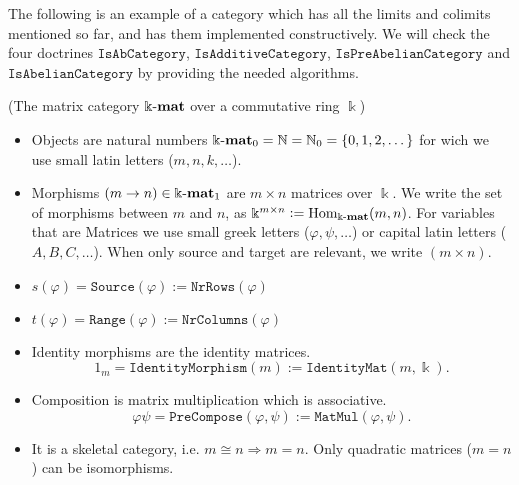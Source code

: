 The following is an example of a category which has all the limits and colimits mentioned so far, and has them implemented constructively.
We will check the four doctrines $\mathtt{IsAbCategory}$, $\mathtt{IsAdditiveCategory}$, $\mathtt{IsPreAbelianCategory}$ and
$\mathtt{IsAbelianCategory}$ by providing the needed algorithms.

\begin{example}{(The matrix category $\Bbbk\textnormal{-}\mathbf{mat}$ over a commutative ring $\Bbbk$)}\label{ex:kmat_skeletal}
\begin{itemize}
\item Objects are natural numbers $\Bbbk\textnormal{-}\mathbf{mat}_{0} = \mathbb{N} = \mathbb{N}_{0} = \{0,1,2,\dots\}$ for wich we use small latin letters
($m, n, k,\dots$).
\item Morphisms $(m \rightarrow n) \in \Bbbk\textnormal{-}\mathbf{mat}_{1}$ are $m \times n$ matrices over $\Bbbk$.
We write the set of morphisms between $m$ and $n$, as $\Bbbk^{m\times n} := \textup{Hom}_{\Bbbk\textnormal{-}\mathbf{mat}}(m,n)$. 
For variables that are Matrices we use small greek letters ($\varphi, \psi,\dots$) or capital latin letters ($A, B, C,\dots$). When only source and target are relevant,
we write $(m \times n)$.
\item $s(\varphi) = \mathtt{Source}(\varphi) := \mathtt{NrRows}(\varphi)$
\item $t(\varphi) = \mathtt{Range}(\varphi) := \mathtt{NrColumns}(\varphi)$
\item Identity morphisms are the identity matrices.
\[
1_{m} = \mathtt{IdentityMorphism}(m) := \mathtt{IdentityMat}(m,\Bbbk).
\]
\item Composition is matrix multiplication which is associative.
\[
\varphi\psi = \mathtt{PreCompose}(\varphi,\psi) := \mathtt{MatMul}(\varphi,\psi).
\]
\item It is a skeletal category, i.e. $m \cong n \Rightarrow m = n$. Only quadratic matrices ($m = n$) can be
isomorphisms.
\end{itemize}
\end{example}

